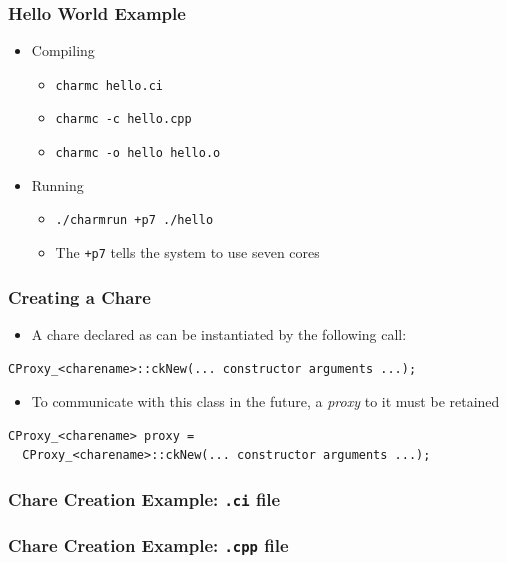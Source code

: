 \begin{frame}
  \frametitle{Hello World Example}
  \begin{itemize}
    \item Compiling
      \begin{itemize}
      \item \texttt{charmc hello.ci}
      \item \texttt{charmc -c hello.cpp}
      \item \texttt{charmc -o hello hello.o}
      \end{itemize}
    \item Running
      \begin{itemize}
      \item \texttt{./charmrun +p7 ./hello}
      \item The \texttt{+p7} tells the system to use seven cores
      \end{itemize}
    \end{itemize}
\end{frame}

\begin{frame}[fragile]
  \frametitle{Creating a Chare}
  \begin{itemize}
    \item A chare declared as  can be
      instantiated by the following call:
  \end{itemize}
\begin{lstlisting}
CProxy_<charename>::ckNew(... constructor arguments ...);
\end{lstlisting}
  \begin{itemize}
  \item To communicate with this class in the future, a \textit{proxy} to it
    must be retained
  \end{itemize}
\begin{lstlisting}
CProxy_<charename> proxy = 
  CProxy_<charename>::ckNew(... constructor arguments ...);
\end{lstlisting}
\end{frame}

\begin{frame}[fragile]
  \frametitle{Chare Creation Example: \texttt{.ci} file}
  
\end{frame}

\begin{frame}[fragile]
  \frametitle{Chare Creation Example: \texttt{.cpp} file}
  
\end{frame}

